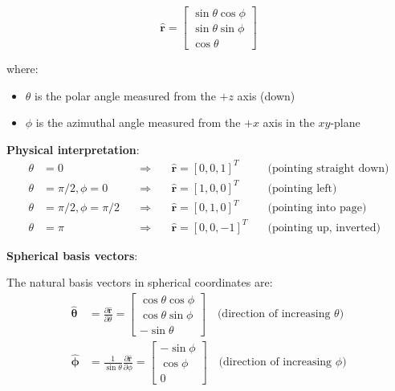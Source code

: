 \documentclass[12pt]{article}
\begin{document}
\begin{equation}
    \hat{\mathbf{r}} = 
    \begin{bmatrix}
        \sin\theta\cos\phi \\
        \sin\theta\sin\phi \\
        \cos\theta
    \end{bmatrix}
\end{equation}

where:
\begin{itemize}
    \item $\theta$ is the polar angle measured from the $+z$ axis (down)
    \item $\phi$ is the azimuthal angle measured from the $+x$ axis in the $xy$-plane
\end{itemize}

\textbf{Physical interpretation}:
\begin{align}
    \theta &= 0 \quad &\Rightarrow \quad &\hat{\mathbf{r}} = [0, 0, 1]^T \quad &\text{(pointing straight down)} \\
    \theta &= \pi/2, \phi = 0 \quad &\Rightarrow \quad &\hat{\mathbf{r}} = [1, 0, 0]^T \quad &\text{(pointing left)} \\
    \theta &= \pi/2, \phi = \pi/2 \quad &\Rightarrow \quad &\hat{\mathbf{r}} = [0, 1, 0]^T \quad &\text{(pointing into page)} \\
    \theta &= \pi \quad &\Rightarrow \quad &\hat{\mathbf{r}} = [0, 0, -1]^T \quad &\text{(pointing up, inverted)}
\end{align}

\textbf{Spherical basis vectors}:

The natural basis vectors in spherical coordinates are:
\begin{align}
    \hat{\boldsymbol{\theta}} &= \frac{\partial \hat{\mathbf{r}}}{\partial \theta} = 
    \begin{bmatrix}
        \cos\theta\cos\phi \\
        \cos\theta\sin\phi \\
        -\sin\theta
    \end{bmatrix}
    \quad \text{(direction of increasing $\theta$)} \\
    \hat{\boldsymbol{\phi}} &= \frac{1}{\sin\theta}\frac{\partial \hat{\mathbf{r}}}{\partial \phi} = 
    \begin{bmatrix}
        -\sin\phi \\
        \cos\phi \\
        0
    \end{bmatrix}
    \quad \text{(direction of increasing $\phi$)}
\end{align}
\end{document}
